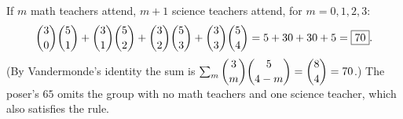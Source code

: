 If $m$ math teachers attend, $m+1$ science teachers attend, for $m=0,1,2,3$:
\[\dbinom30\dbinom51+\dbinom31\dbinom52+\dbinom32\dbinom53+\dbinom33\dbinom54=5+30+30+5=\boxed{70}.\]
(By Vandermonde's identity the sum is $\sum_m\dbinom3m\dbinom5{4-m}=\dbinom84=70$.) The poser's $65$ omits the group with no math teachers and one science teacher, which also satisfies the rule.
